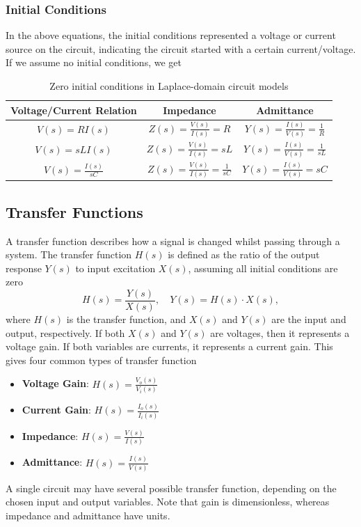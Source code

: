 \documentclass{article}
\begin{document}
\subsubsection{Initial Conditions}
In the above equations, the initial conditions represented a voltage or current source on the circuit, indicating the circuit started with a certain current/voltage. If we assume no initial conditions, we get
\begin{table}[H]
    \centering
    \caption{Zero initial conditions in Laplace-domain circuit models}
    \label{tab:s4-t1}
    \begin{tabular}{c|c|c}
        Voltage/Current Relation & Impedance & Admittance \\
        \hline
        \hline
        $V(s)=RI(s)$ & $Z(s)=\frac{V(s)}{I(s)}=R$ & $Y(s)=\frac{I(s)}{V(s)}=\frac{1}{R}$ \\
        $V(s)=sLI(s)$ & $Z(s)=\frac{V(s)}{I(s)}=sL$ & $Y(s)=\frac{I(s)}{V(s)}=\frac{1}{sL}$ \\
        $V(s)=\frac{I(s)}{sC}$ & $Z(s)=\frac{V(s)}{I(s)}=\frac{1}{sC}$ & $Y(s)=\frac{I(s)}{V(s)}=sC$
    \end{tabular}
\end{table}

\subsection{Transfer Functions}
A transfer function describes how a signal is changed whilst passing through a system. The transfer function $H(s)$ is defined as the ratio of the output response $Y(s)$ to input excitation $X(s)$, assuming all initial conditions are zero
\[
    H(s)=\frac{Y(s)}{X(s)},\quad Y(s)=H(s)\cdot X(s),
\]
where $H(s)$ is the transfer function, and $X(s)$ and $Y(s)$ are the input and output, respectively. If both $X(s)$ and $Y(s)$ are voltages, then it represents a voltage gain. If both variables are currents, it represents a current gain. This gives four common types of transfer function
\begin{itemize}
    \item \textbf{Voltage Gain}: $H(s)=\frac{V_o(s)}{V_i(s)}$
    \item \textbf{Current Gain}: $H(s)=\frac{I_o(s)}{I_i(s)}$
    \item \textbf{Impedance}: $H(s)=\frac{V(s)}{I(s)}$
    \item \textbf{Admittance}: $H(s)=\frac{I(s)}{V(s)}$
\end{itemize}
A single circuit may have several possible transfer function, depending on the chosen input and output variables. Note that gain is dimensionless, whereas impedance and admittance have units.
\end{document}

